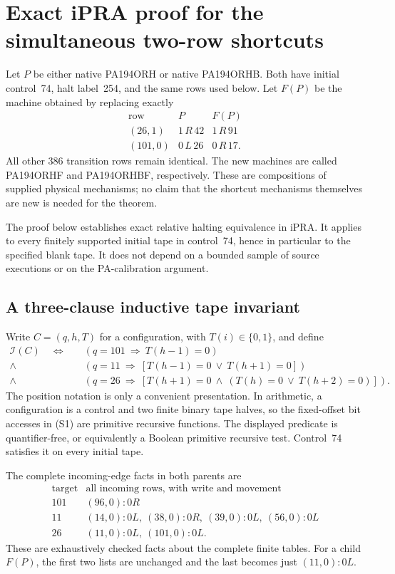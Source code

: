 \section{Exact iPRA proof for the simultaneous two-row shortcuts}
\label{sec:shortcut-stuttering}

Let $P$ be either native PA194ORH or native PA194ORHB.  Both have initial
control~74, halt label~254, and the same rows used below.  Let $F(P)$ be the
machine obtained by replacing exactly
\[
\begin{array}{c|c|c}
\text{row}&P&F(P)\\\hline
(26,1)&1\,R\,42&1\,R\,91\\
(101,0)&0\,L\,26&0\,R\,17.
\end{array}
\]
All other 386 transition rows remain identical.  The new machines are called
PA194ORHF and PA194ORHBF, respectively.  These are compositions of supplied
physical mechanisms; no claim that the shortcut mechanisms themselves are
new is needed for the theorem.

The proof below establishes exact relative halting equivalence in iPRA.
It applies to every finitely supported initial tape in control~74, hence
in particular to the specified blank tape.  It does not depend on a bounded
sample of source executions or on the PA-calibration argument.

\subsection{A three-clause inductive tape invariant}

Write $C=(q,h,T)$ for a configuration, with $T(i)\in\{0,1\}$, and define
\[
\begin{split}
 \mathcal I(C)\quad\Longleftrightarrow\quad
 &(q=101\ \Rightarrow\ T(h-1)=0)\\
 {}\land{}&(q=11\ \Rightarrow\ [T(h-1)=0\ \lor\ T(h+1)=0])\\
 {}\land{}&(q=26\ \Rightarrow\
       [T(h+1)=0\ \land\ (T(h)=0\ \lor\ T(h+2)=0)]).
\end{split}                                                    \tag{S1}
\]
The position notation is only a convenient presentation.  In arithmetic,
a configuration is a control and two finite binary tape halves, so the
fixed-offset bit accesses in (S1) are primitive recursive functions.
The displayed predicate is quantifier-free, or equivalently a Boolean
primitive recursive test.  Control~74 satisfies it on every initial tape.

The complete incoming-edge facts in both parents are
\[
\begin{array}{c|l}
\text{target}&\text{all incoming rows, with write and movement}\\\hline
101&(96,0):0R\\
11&(14,0):0L,\ (38,0):0R,\ (39,0):0L,\ (56,0):0L\\
26&(11,0):0L,\ (101,0):0L.
\end{array}                                                    \tag{S2}
\]
These are exhaustively checked facts about the complete finite tables.
For a child $F(P)$, the first two lists are unchanged and the last becomes
just $(11,0):0L$.

